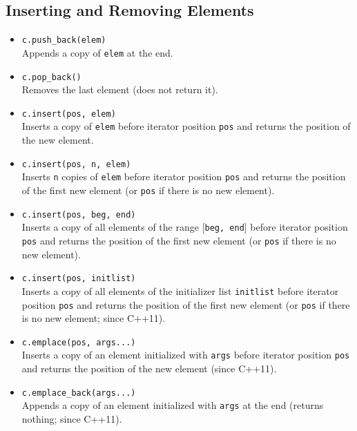 \documentclass{report}
\begin{document}
\subsection{Inserting and Removing Elements}
\begin{itemize}
    \item \texttt{c.push\_back(elem)} \\
          Appends a copy of \texttt{elem} at the end.
          
    \item \texttt{c.pop\_back()} \\
          Removes the last element (does not return it).
          
    \item \texttt{c.insert(pos, elem)} \\
          Inserts a copy of \texttt{elem} before iterator position \texttt{pos} and returns the position of the new element.
          
    \item \texttt{c.insert(pos, n, elem)} \\
          Inserts \texttt{n} copies of \texttt{elem} before iterator position \texttt{pos} and returns the position of the first new element (or \texttt{pos} if there is no new element).
          
    \item \texttt{c.insert(pos, beg, end)} \\
          Inserts a copy of all elements of the range [\texttt{beg, end}] before iterator position \texttt{pos} and returns the position of the first new element (or \texttt{pos} if there is no new element).
          
    \item \texttt{c.insert(pos, initlist)} \\
          Inserts a copy of all elements of the initializer list \texttt{initlist} before iterator position \texttt{pos} and returns the position of the first new element (or \texttt{pos} if there is no new element; since C++11).
          
    \item \texttt{c.emplace(pos, args...)} \\
          Inserts a copy of an element initialized with \texttt{args} before iterator position \texttt{pos} and returns the position of the new element (since C++11).
          
    \item \texttt{c.emplace\_back(args...)} \\
          Appends a copy of an element initialized with \texttt{args} at the end (returns nothing; since C++11).
          

\end{itemize}
\end{document}
